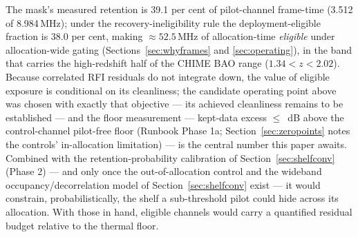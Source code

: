 The mask's measured retention is 39.1 per cent of pilot-channel
frame-time (3.512 of 8.984\,MHz); under the recovery-ineligibility rule
the deployment-eligible fraction is 38.0 per cent, making $\approx
52.5$\,MHz of
allocation-time \emph{eligible} under allocation-wide gating
(Sections~\ref{sec:whyframes} and \ref{sec:operating}), in the band that
carries the high-redshift half of the CHIME BAO range
($1.34 < z < 2.02$). Because correlated RFI
residuals do not integrate down, the value of eligible exposure is
conditional on its cleanliness; the candidate operating point above was
chosen with exactly that objective --- its achieved cleanliness remains
to be established --- and the floor measurement --- kept-data excess
$\le$ \,dB above the control-channel pilot-free floor (Runbook
Phase 1a; Section~\ref{sec:zeropoints} notes the controls' in-allocation
limitation) --- is the central number this paper awaits. Combined with the
retention-probability calibration of Section~\ref{sec:shelfconv}
(Phase 2) --- and only once the out-of-allocation control and the
wideband occupancy/decorrelation model of Section~\ref{sec:shelfconv}
exist --- it would constrain, probabilistically, the shelf a
sub-threshold pilot could hide across its allocation. With those in
hand, eligible channels would carry a quantified residual budget
relative to the thermal floor.

